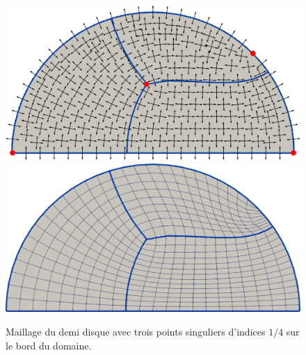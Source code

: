 \begin{figure}[!h]
\centering
\includegraphics[scale=0.24]{images/yo_11.pdf}\\[0.5cm]
\includegraphics[scale=0.24]{images/yo_12.pdf}
\caption{Maillage du demi disque avec trois points singuliers d'indices $1/4$ sur le bord du domaine.}
\label{fig:demiDisc_sing_bord_second}
\end{figure}

